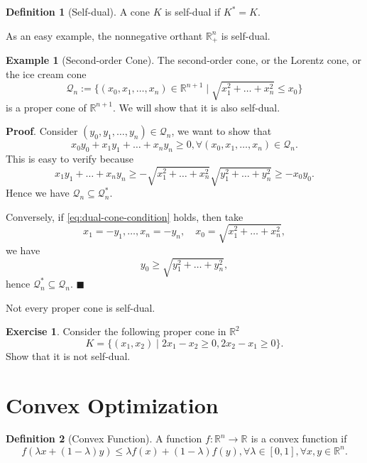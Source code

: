 \documentclass[
]{book}
\theoremstyle{definition}
\newtheorem{definition}{Definition}[chapter]
\theoremstyle{definition}
\newtheorem{example}{Example}[chapter]
\theoremstyle{definition}
\newtheorem{exercise}{Exercise}[chapter]
\theoremstyle{definition}
\theoremstyle{remark}
\begin{document}
\begin{definition}[Self-dual]
\protect\hypertarget{def:selfdual}{}\label{def:selfdual}A cone \(K\) is self-dual if \(K^{*} = K\).
\end{definition}

As an easy example, the nonnegative orthant \(\mathbb{R}^{n}_{+}\) is self-dual.

\begin{example}[Second-order Cone]
\protect\hypertarget{exm:SecondOrderCone}{}\label{exm:SecondOrderCone}The second-order cone, or the Lorentz cone, or the ice cream cone
\[
\mathcal{Q}_n := \{  (x_0,x_1,\dots,x_n) \in \mathbb{R}^{n+1} \mid \sqrt{x_1^2 + \dots + x_n^2} \leq x_0  \}
\]
is a proper cone of \(\mathbb{R}^{n+1}\). We will show that it is also self-dual.

\textbf{Proof}. Consider \((y_0,y_1,\dots,y_n) \in \mathcal{Q}_n\), we want to show that
\begin{equation}
x_0 y_0 + x_1 y_1 + \dots + x_n y_n \geq 0, \forall (x_0,x_1,\dots,x_n) \in \mathcal{Q}_n.
\label{eq:dual-cone-condition}
\end{equation}
This is easy to verify because
\[
x_1 y_1 + \dots + x_n y_n \geq - \sqrt{x_1^2 + \dots + x_n^2} \sqrt{y_1^2 + \dots + y_n^2} \geq - x_0 y_0.
\]
Hence we have \(\mathcal{Q}_n \subseteq \mathcal{Q}_n^{*}\).

Conversely, if \eqref{eq:dual-cone-condition} holds, then take
\[
x_1 = -y_1, \dots, x_n = - y_n, \quad x_0 = \sqrt{x_1^2 + \dots + x_n^2},
\]
we have
\[
y_0 \geq \sqrt{y_1^2 + \dots + y_n^2},
\]
hence \(\mathcal{Q}_n^{*} \subseteq \mathcal{Q}_n\). \(\blacksquare\)
\end{example}

Not every proper cone is self-dual.

\begin{exercise}
Consider the following proper cone in \(\mathbb{R}^{2}\)
\[
K = \{ (x_1,x_2) \mid 2x_1 - x_2 \geq 0, 2x_2 - x_1 \geq 0 \}.
\]
Show that it is not self-dual.
\end{exercise}

\hypertarget{background:convex:optimization}{%
\section{Convex Optimization}\label{background:convex:optimization}}

\begin{definition}[Convex Function]
\protect\hypertarget{def:ConvexFun}{}\label{def:ConvexFun}A function \(f: \mathbb{R}^{n} \rightarrow \mathbb{R}^{}\) is a convex function if
\[
f(\lambda x + (1-\lambda) y) \leq \lambda f(x) + (1-\lambda) f(y), \forall \lambda \in [0,1], \forall x,y \in \mathbb{R}^{n}.
\]
\end{definition}
\end{document}
